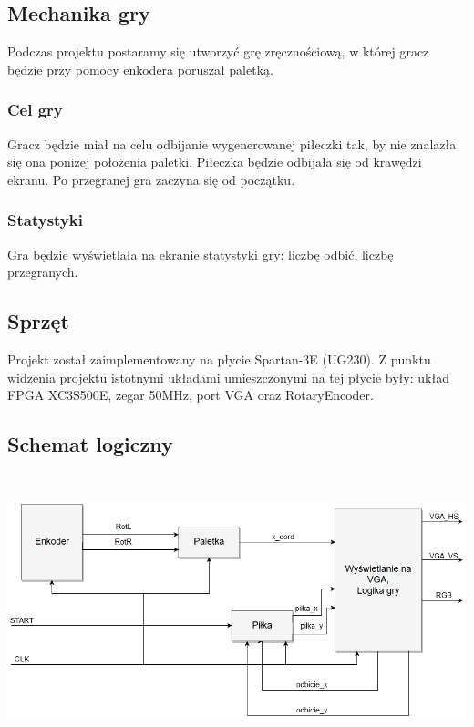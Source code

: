 \documentclass[12pt,a4paper]{article}
\begin{document}
\subsection{Mechanika gry}
Podczas projektu postaramy się utworzyć grę zręcznościową, w której gracz będzie przy pomocy enkodera poruszał paletką.
\subsubsection{Cel gry}
Gracz będzie miał na celu odbijanie wygenerowanej piłeczki tak, by nie znalazła się ona poniżej położenia paletki. Piłeczka będzie odbijała się od krawędzi ekranu. Po przegranej gra zaczyna się od początku.
\subsubsection{Statystyki}
Gra będzie wyświetlała na ekranie statystyki gry: liczbę odbić, liczbę przegranych.

\subsection{Sprzęt}
Projekt został zaimplementowany na płycie Spartan-3E (UG230). Z punktu widzenia projektu istotnymi układami umieszczonymi na tej płycie były: układ FPGA XC3S500E, zegar 50MHz, port VGA oraz RotaryEncoder.

\subsection{Schemat logiczny}
\begin{center}
\includegraphics[width=16cm, height=8cm]{schametzalozenia.png}    
\end{center}
\end{document}
